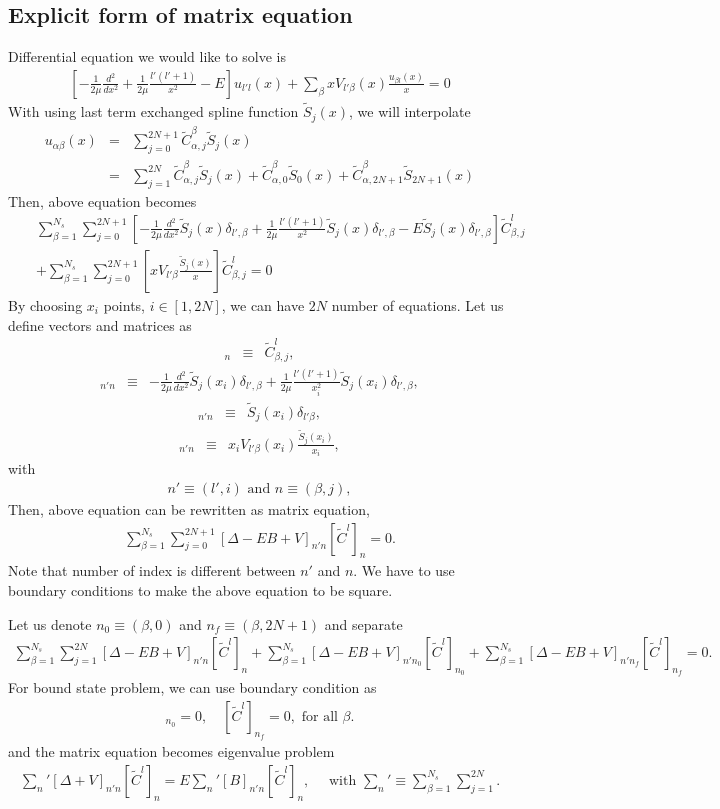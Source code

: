 \documentclass[10pt]{article}
\newcommand{\bea}{\begin{eqnarray}}
\newcommand{\eea}{\end{eqnarray}}
\newcommand{\no}{\nonumber \\}
\begin{document}
\subsection{Explicit form of matrix equation}
Differential equation we would like to solve is
\bea 
\left[ -\frac{1}{2\mu}\frac{d^2}{dx^2}+\frac{1}{2\mu}\frac{l'(l'+1)}{x^2}-E\right] 
u_{l' l}(x)+\sum_{\beta} x V_{l'\beta}(x) \frac{u_{\beta l}(x)}{x} =0
\eea 
With using last term exchanged spline function $\tilde{S}_j(x)$,
we will interpolate
\bea 
u_{\alpha\beta}(x)&=&\sum_{j=0}^{2N+1}\tilde{C}_{\alpha,j}^{\beta} \tilde{S}_j(x) \no 
                  &=&\sum_{j=1}^{2N} \tilde{C}_{\alpha,j}^{\beta} \tilde{S}_j(x)
                  +\tilde{C}_{\alpha,0}^{\beta} \tilde{S}_0(x)
                  +\tilde{C}_{\alpha,2N+1}^{\beta} \tilde{S}_{2N+1}(x)
\eea 
Then, above equation becomes
\bea 
& &\sum_{\beta=1}^{N_{s}}\sum_{j=0}^{2N+1} 
\left[-\frac{1}{2\mu}\frac{d^2}{dx^2}\tilde{S}_j(x)\delta_{l',\beta}
     +\frac{1}{2\mu}\frac{l'(l'+1)}{x^2}\tilde{S}_j(x)\delta_{l',\beta}-E\tilde{S}_j(x)\delta_{l',\beta}
     \right]
     \tilde{C}_{\beta,j}^{l} \no 
& &+\sum_{\beta=1}^{N_{s}}\sum_{j=0}^{2N+1}
 \left[x V_{l'\beta}\frac{\tilde{S}_j(x)}{x} \right]\tilde{C}_{\beta,j}^{l} =0
\eea 
By choosing $x_i$ points, $i\in[1,2N]$, 
we can have $2N$ number of equations.
Let us define vectors and matrices as
\bea 
[\tilde{C}^l]_{n}&\equiv& \tilde{C}^l_{\beta,j} ,
\eea
\bea 
[\Delta]_{n'n}&\equiv& 
         -\frac{1}{2\mu}\frac{d^2}{dx^2}\tilde{S}_j(x_i)\delta_{l',\beta}
              +\frac{1}{2\mu}\frac{l'(l'+1)}{x_i^2}\tilde{S}_j(x_i)\delta_{l',\beta},   
\eea 
\bea 
[B]_{n'n}&\equiv& \tilde{S}_j(x_i) \delta_{l'\beta}, 
\eea 
\bea 
[V]_{n'n}&\equiv& x_i V_{l'\beta}(x_i)\frac{\tilde{S}_j(x_i)}{x_i}, 
\eea 
with
\bea 
n'\equiv(l',i) \mbox{ and }  n\equiv(\beta,j),
\eea 
Then, above equation can be rewritten as matrix equation,
\bea 
\sum_{\beta=1}^{N_{s}}\sum_{j=0}^{2N+1}[\Delta -E B +V]_{n'n}[\tilde{C}^l]_n=0.
\eea 
Note that number of index is different between $n'$ and $n$. 
We have to use boundary conditions to make the above equation to be 
square. 

Let us denote $n_0\equiv(\beta,0)$ and $n_f\equiv(\beta,2N+1)$ and separate
\bea 
\sum_{\beta=1}^{N_{s}}\sum_{j=1}^{2N}[\Delta -E B +V]_{n'n}[\tilde{C}^l]_n
+\sum_{\beta=1}^{N_{s}}[\Delta -E B +V]_{n'n_0}[\tilde{C}^l]_{n_0}
+\sum_{\beta=1}^{N_{s}}[\Delta -E B +V]_{n'n_f}[\tilde{C}^l]_{n_f}
=0.
\eea 
For bound state problem, we can use boundary condition as
\bea 
[\tilde{C}^l]_{n_0}=0,\quad [\tilde{C}^l]_{n_f}=0, \mbox{ for all }\beta. 
\eea  
and the matrix equation becomes eigenvalue problem
\bea 
{\sum_{n}}'[\Delta+V]_{n'n}[\tilde{C}^l]_n=E{\sum_{n}}'[B]_{n'n}[\tilde{C}^l]_n,
\quad \mbox{ with } {\sum_{n}}'\equiv \sum_{\beta=1}^{N_s}\sum_{j=1}^{2N}.
\eea 
\end{document}

